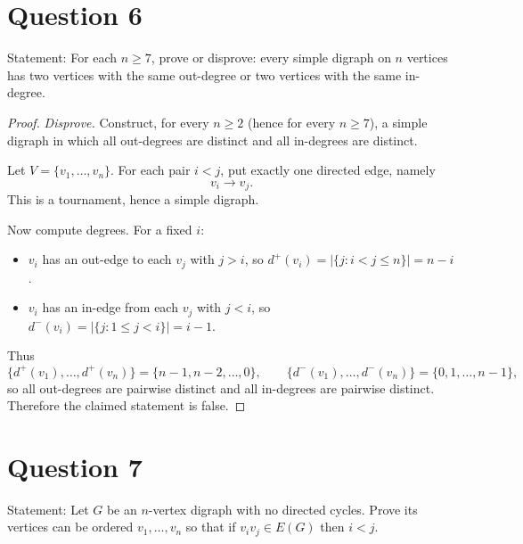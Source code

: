 \documentclass[11pt]{article}
\begin{document}
\newpage
\section*{Question 6}
\noindent Statement: For each $n\ge 7$, prove or disprove: every simple digraph on $n$ vertices has two vertices
with the same out-degree or two vertices with the same in-degree.

\begin{proof}
\emph{Disprove.} Construct, for every $n\ge 2$ (hence for every $n\ge 7$), a simple digraph in which
all out-degrees are distinct and all in-degrees are distinct.

Let $V=\{v_1,\dots,v_n\}$. For each pair $i<j$, put exactly one directed edge, namely
\[
v_i \to v_j.
\]
This is a tournament, hence a simple digraph.

Now compute degrees. For a fixed $i$:
\begin{itemize}
\item $v_i$ has an out-edge to each $v_j$ with $j>i$, so $d^+(v_i)=|\{j:i<j\le n\}|=n-i$.
\item $v_i$ has an in-edge from each $v_j$ with $j<i$, so $d^-(v_i)=|\{j:1\le j<i\}|=i-1$.
\end{itemize}

Thus
\[
\{d^+(v_1),\dots,d^+(v_n)\}=\{n-1,n-2,\dots,0\},
\qquad
\{d^-(v_1),\dots,d^-(v_n)\}=\{0,1,\dots,n-1\},
\]
so all out-degrees are pairwise distinct and all in-degrees are pairwise distinct. Therefore the claimed statement is false.
\end{proof}

\newpage
\section*{Question 7}
\noindent Statement: Let $G$ be an $n$-vertex digraph with no directed cycles. Prove its vertices can be ordered
$v_1,\dots,v_n$ so that if $v_iv_j\in E(G)$ then $i<j$.
\end{document}
